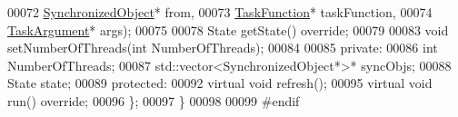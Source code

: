 \begin{DoxyCode}
00072                   \hyperlink{classdsf_1_1_synchronized_object}{SynchronizedObject}* from,
00073                   \hyperlink{namespacedsf_aa16e735f29587f4485b56fc46746f7a9}{TaskFunction}* taskFunction,
00074                   \hyperlink{classyc_1_1_any}{TaskArgument}* args);
00075         
00078         State getState() \textcolor{keyword}{override};
00079         
00083         \textcolor{keywordtype}{void} setNumberOfThreads(\textcolor{keywordtype}{int} NumberOfThreads);
00084         
00085     \textcolor{keyword}{private}:
00086         \textcolor{keywordtype}{int} NumberOfThreads;
00087         std::vector<SynchronizedObject*>* syncObjs;
00088         State state;
00089     \textcolor{keyword}{protected}:
00092         \textcolor{keyword}{virtual} \textcolor{keywordtype}{void} refresh();
00095          \textcolor{keyword}{virtual} \textcolor{keywordtype}{void} run() \textcolor{keyword}{override};
00096     \};
00097 \}
00098 
00099 \textcolor{preprocessor}{#endif}
\end{DoxyCode}
